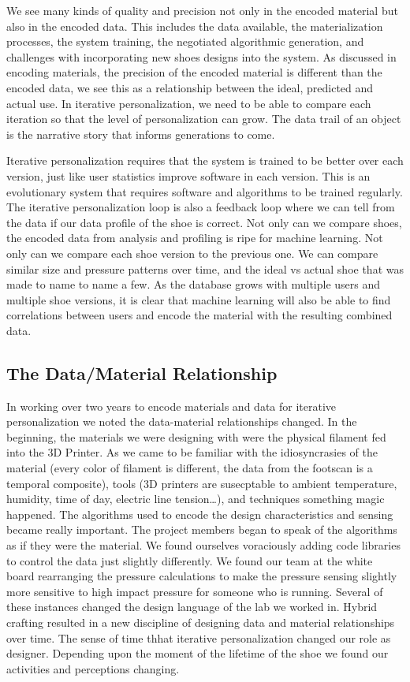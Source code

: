 We see many kinds of quality and precision not only in the encoded material but also in the encoded data. This includes the data available, the materialization processes, the system training, the negotiated algorithmic generation, and challenges with incorporating new shoes designs into the system. As discussed in encoding materials, the precision of the encoded material is different than the encoded data, we see this as a relationship between the ideal, predicted and actual use. In iterative personalization, we need to be able to compare each iteration so that the level of personalization can grow. The data trail of an object is the narrative story that informs generations to come.  

Iterative personalization requires that the system is trained to be better over each version, just like user statistics improve software in each version. This is an evolutionary system that requires software and algorithms to be trained regularly. The iterative personalization loop is also a feedback loop where we can tell from the data if our data profile of the shoe is correct. Not only can we compare shoes, the encoded data from analysis and profiling is ripe for machine learning. Not only can we compare each shoe version to the previous one. We can compare similar size and pressure patterns over time, and the ideal vs actual shoe that was made to name to name a few. As the database grows with multiple users and multiple shoe versions, it is clear that machine learning will also be able to find correlations between users and encode the material with the resulting combined data.  

\subsection{The Data/Material Relationship}
In working over two years to encode materials and data for iterative personalization we noted the data-material relationships changed. In the beginning, the materials we were designing with were the physical filament fed into the 3D Printer. As we came to be familiar with the idiosyncrasies of the material (every color of filament is different, the data from the footscan is a temporal composite), tools (3D printers are susecptable to ambient temperature, humidity, time of day, electric line tension…), and techniques something magic happened. The algorithms used to encode the design characteristics and sensing became really important. The project members began to speak of the algorithms as if they were the material. We found ourselves voraciously adding code libraries to control the data just slightly differently. We found our team at the white board rearranging the pressure calculations to make the pressure sensing slightly more sensitive to high impact pressure for someone who is running. Several of these instances changed the design language of the lab we worked in. Hybrid crafting resulted in a new discipline of designing data and material relationships over time. The sense of time thhat iterative personalization changed our role as designer. Depending upon the moment of the lifetime of the shoe we found our activities and perceptions changing.   

